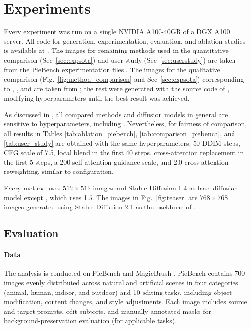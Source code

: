 \section{Experiments}
\label{sec:experiments}
Every \method{} experiment was run on a single NVIDIA A100-40GB of a DGX A100 server. All code for generation, experimentation, evaluation, and ablation studies {\modified{}is} available at \codeurl.
The images for remaining methods used in the quantitative comparison (Sec~\ref{sec:expsota}) and user study (Sec~\ref{sec:userstudy}) are taken from the PieBench experimentation files \cite{ju2023direct}. The images for the qualitative comparison (Fig.~\ref{fig:method_comparison} and Sec~\ref{sec:expsota}) corresponding to \nulltext{}, \negative{}, and \negprox{} are taken from \cite{han2023proximal}; the rest were generated with the source code of \cite{ju2023direct}, modifying hyperparameters until the best result was achieved.

As discussed in \cite{mokady2023null,han2023proximal}, all compared methods and diffusion models in general \cite{ho2021classifier} are sensitive to hyperparameters, including {\modified{}\method{}}. Nevertheless, for fairness of comparison, all \method{} results in Tables \ref{tab:ablation_piebench}, \ref{tab:comparison_piebench}, and \ref{tab:user_study} are obtained with the same hyperparameters: 50 DDIM steps, CFG scale of 7.5, local blend in the first 40 steps, cross-attention replacement in the first 5 steps, a 200 self-attention guidance scale, and 2.0 cross-attention reweighting, similar to \directinversion{} \cite{ju2023direct} configuration.


Every method uses $512 \times 512$ images and Stable Diffusion 1.4 as base diffusion model except \pnplong{}, {\modified{}which} uses 1.5. The images in Fig.~\ref{fig:teaser} are $768 \times 768$ images generated using Stable Diffusion 2.1 as the backbone of \method{}.

  


\subsection{Evaluation}

\paragraph{Data} {\modified{}The analysis is conducted} on PieBench \cite{ju2023direct} and MagicBrush \cite{Zhang2023MagicBrush}. PieBench contains 700 images evenly distributed across natural and artificial scenes in four categories (animal, human, indoor, and outdoor) and 10 editing tasks, including object modification, content changes, and style adjustments. Each image includes source and target prompts, edit subjects, and manually annotated masks for background-preservation evaluation (for applicable tasks).  

